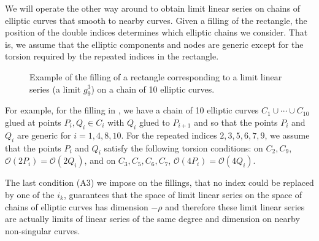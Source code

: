 \documentclass[11pt]{amsart}
\newcommand{\g}[2]{g^{#1}_{#2}}
\theoremstyle{definition}
\theoremstyle{definition}
\begin{document}
We will operate the other way around to obtain limit linear series on chains of elliptic curves that smooth to nearby curves. Given a filling of the rectangle, the position of the double indices determines which elliptic chains we consider. That is, 
we assume that the elliptic components and nodes are generic except for the torsion required by the repeated indices in the rectangle.
 \begin{figure}[h!]
\caption{  Example of the filling of a rectangle corresponding to a limit linear series (a limit $\g{3}{9}$) on a chain of 10 elliptic curves.}
\label{figex}
\end{figure}
	
For example, for the filling in , we have a chain of 10 elliptic curves $C_1\cup\cdots\cup C_{10}$ glued at points $P_i, Q_i\in C_i$ with $Q_i$  glued to $P_{i+1}$ and so  that the points $P_i$ and $Q_i$ are generic for $i=1, 4, 8, 10$. For the repeated indices $2,3,5,6,7,9$, we assume that the points $P_i$ and $Q_i$ satisfy the following torsion conditions: 
on $C_2, C_9$, ${\mathcal O}(2P_i)={\mathcal O}(2Q_i)$, and on $C_3, C_5, C_6, C_7$, ${\mathcal O}(4P_i)={\mathcal O}(4Q_i)$.

The last condition (A3) we impose on the fillings, that no index could be replaced by one of the $i_k$, guarantees that the space of limit linear series on the space of chains of elliptic curves has dimension $-\rho$ and therefore these limit linear series are actually limits of linear series of the same degree and dimension on nearby non-singular curves.
\end{document}
